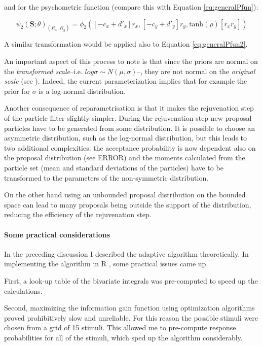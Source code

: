 \documentclass{article}\usepackage{knitr}
\begin{document}
and for the psychometric function (compare this with Equation \ref{eq:generalPfun}):

\begin{equation}
\psi_2(\bm{S}; \theta)_{(R_x, R_y)} = \phi_2([-c_x + d'_x]r_x, [-c_y + d'_y] r_y, \text{tanh}(\rho) [r_x r_y])
\end{equation}

A similar transformation would be applied also to Equation \ref{eq:generalPfun2}.

An important aspect of this process to note is that since the priors are normal on the \textit{transformed scale}--i.e. $log\sigma \sim N(\mu, \sigma)$--, they are not normal on the \textit{original scale} (see \citealt[pp. 729 - 732]{kruschke2015}). Indeed, the current parameterization implies that for  example the prior for $\sigma$ is a log-normal distribution.

Another consequence of reparametrisation is that it makes the rejuvenation step of the particle filter slightly simpler. During the rejuvenation step new proposal particles have to be generated from some distribution. It is possible to choose an asymmetric distribution, such as the log-normal distribution, but this leads to two additional complexities: the acceptance probability is now dependent also on the proposal distribution (see ERROR) and the moments calculated from the particle set (mean and standard deviations of the particles) have to be transformed to the parameters of the non-symmetric distribution. 

On the other hand using an unbounded proposal distribution on the bounded space can lead to many proposals  being  outside the support of the distribution, reducing the efficiency of the rejuvenation step.

\paragraph{Some practical considerations}
\label{sec:practical_considerations}

In the preceding discussion I described the adaptive algorithm theoretically. In implementing the algorithm in R \citep{r_language}, some practical issues came up. 

First, a look-up table of the bivariate integrals was pre-computed to speed up the calculations. 

Second, maximizing the information gain function using optimization algorithms proved prohibitively slow and unreliable. For this reason the possible stimuli were chosen from a grid of 15 stimuli. This allowed me to pre-compute response probabilities for all of the stimuli, which sped up the algorithm considerably. 
\end{document}
